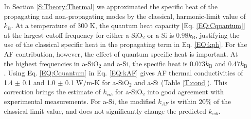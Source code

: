 \documentclass[aps,prb,onecolumn,preprint,superscriptaddress,footinbib,amsmath,amssymb,floatfix]{revtex4}
\begin{document}
In Section \ref{S:Theory:Thermal} we approximated the specific heat 
of the propagating 
and non-propagating modes by the classical, harmonic-limit 
value of $k_{\text{B}}$. At a temperature of $300$ K, the quantum 
heat capacity [Eq. \eqref{EQ:Cquantum}] 
at the largest cutoff frequency for either a-SiO$_2$ or a-Si 
is $0.98 k_{\text{B}}$, justifying the 
use of the classical specific heat in the propagating term 
in Eq. \eqref{EQ:kph}. For the AF contribution, however, the 
effect of quantum specific heat is important. At the highest 
frequencies in a-SiO$_2$ and a-Si, the specific heat is 
0.073$k_{\text{B}}$ and 0.47$k_{\text{B}}$. 
Using Eq. \eqref{EQ:Cquantum} 
in Eq. \eqref{EQ:kAF} gives AF thermal conductivities of 
1.4 $\pm$ 0.1 and 
1.0 $\pm$ 0.1 W/m-K for a-SiO$_2$ and a-Si (Table \ref{T:cond}). 
This correction brings the estimate of $k_{vib}$ for 
a-SiO$_2$ into good agreement with experimental measurements.
\cite{cahill_lattice_1988,lee_heat_1997,
yamane_measurement_2002,regner_broadband_2013} 
For a-Si, the modified $k_{AF}$ is within 20$\%$ of the 
classical-limit value, 
and does not significantly change the predicted $k_{vib}$. 
\end{document}
